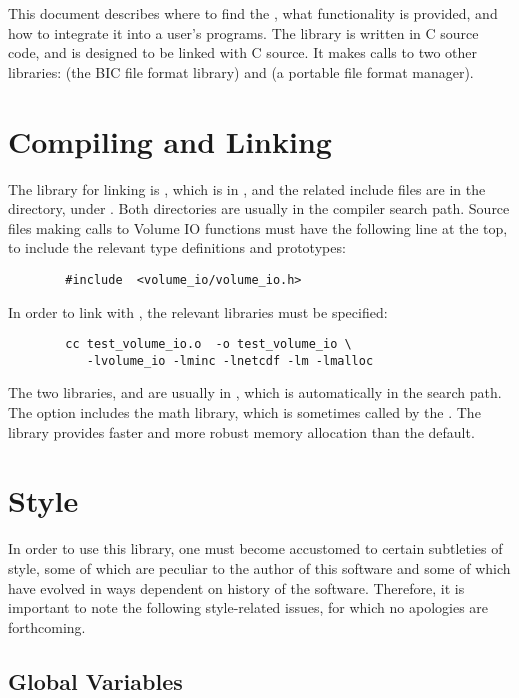 This document describes where to find the \vol,
what functionality is provided, and
how to integrate it into a user's programs.
The library is written in C source code, and is designed
to be linked with C source.  It makes calls to two other libraries:
 (the BIC file format library)
and  (a portable file format manager).

\chapter{Compiling and Linking}

The library for linking is , which is in
, and the related include files are in the directory,
 under .  Both directories
are usually in the compiler search path.
Source files making calls to Volume IO functions must have the
following line at the top, to include the relevant type definitions and
prototypes:

{\bf\begin{verbatim}
        #include  <volume_io/volume_io.h>
\end{verbatim}}

In order to link with \vol, the relevant libraries must be
specified:
{\bf\begin{verbatim}
        cc test_volume_io.o  -o test_volume_io \
           -lvolume_io -lminc -lnetcdf -lm -lmalloc
\end{verbatim}}

The two libraries,  and 
are usually in , which is
automatically in the search path.  The  option includes the
math library, which is sometimes called by the \vol.
The  library provides faster and more robust memory
allocation than the default.

\chapter{Style}

In order to use this library, one must become accustomed to certain
subtleties of style, some of which are peculiar to the author of this
software and some of which have evolved in ways dependent on history
of the software.  Therefore, it is important to note the following
style-related issues, for which no apologies are forthcoming.

\section{Global Variables}


